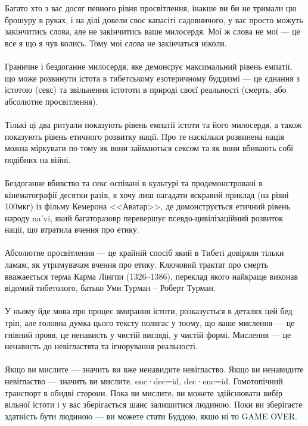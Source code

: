 Багато хто з вас досяг певного рівня просвітлення, інакше ви би не тримали цю брошуру в руках,
і на ділі довели своє капасіті садовничого, у вас просто можуть закінчитись слова, але не закінчитись
ваше милосердя. Мої ж слова не мої --- це все я що я чув колись. Тому мої слова не закінчаться ніколи.
\\
\\
Граничне і бездоганне милосердя, яке демонсрує максимальний рівень емпатії, що може розвинути істота
в тибетському езотеричному буддизмі --- це єднання з істотою (секс) та звільнення істототи в природі
своєї реальності (смерть, або абсолютне просвітлення).
\\
\\
Тількі ці два ритуали показують рівень емпатії істоти та його милосердя, а також показують
рівень етичного розвитку нації. Про те наскільки розвинена нація можна міркувати по тому як
вони займаються сексом та як вони вбивають собі подібних на війні.
\\
\\
Бездоганне вбивство та секс оспівані в культурі та продемонстровані в кінематографії десятки разів,
я хочу лиш нагадати яскравий приклад (на рівні 100мкг) із фільму Кемерона <<Аватар>>, де домонструється
етичний рівень народу  na'vi, який багаторазовр перевершує псевдо-цивілізаційний розвиток нації,
що втратила вчення про етику.
\\
\\
Абсолютне просвітлення --- це крайній спосіб який в Тибеті довіряли тільки ламам,
як утримувачам вчення про етику. Ключовий трактат про смерть вважаеється терма Карма Лінгпи (1326–1386),
переклад якого найкраще виконав відомий тибетолого, батько Уми Турман -- Роберт Турман.
\\
\\
У ньому йде мова про процес вмирання істоти, розказується в деталях цей бед тріп,
але головна думка цього тексту полягає у тоому, що ваше мислення --- це гнівний прояв,
це ненависть у чистій вигляді, у чистій формі. Мислення --- це ненависть до невігластвта та
ігнорування реальності.
\\
\\
Якщо ви мислите --- значить ви вже ненавидите невігластво. Якщо ви ненавидите невігластво --- значить ви мислите.
enc·dec=id, dec·enc=id. Гомотопічний транспорт в обидві сторони. Пока ви мислите, ви можете
здійснювати вибір вільної істоти і у вас зберігається шанс залишитися людиною. Поки ви зберігаєте
здатність бути людиною --- ви можете стати Буддою, якшо ні то GAME OVER.
\\
